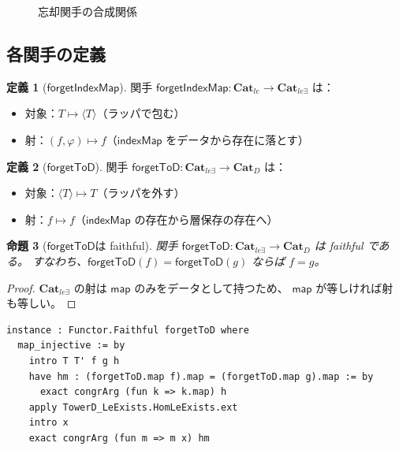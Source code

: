 \documentclass[a4paper,11pt]{ltjsarticle}
\theoremstyle{definition}
\newtheorem{definition}{定義}[section]
\theoremstyle{plain}
\newtheorem{proposition}[definition]{命題}
\newcommand{\CatD}{\mathbf{Cat}_D}
\newcommand{\Catle}{\mathbf{Cat}_{le}}
\newcommand{\CatleE}{\mathbf{Cat}_{le\exists}}
\newcommand{\indexMap}{\mathsf{indexMap}}
\begin{document}
\begin{figure}[htbp]
\centering
{}
\caption{忘却関手の合成関係}
\label{fig:forgetful-functors}
\end{figure}

\subsection{各関手の定義}

\begin{definition}[$\mathsf{forgetIndexMap}$]
\label{def:forget-index-map}
関手 $\mathsf{forgetIndexMap} : \Catle \to \CatleE$ は：
\begin{itemize}
  \item 対象：$T \mapsto \langle T \rangle$（ラッパで包む）
  \item 射：$(f, \varphi) \mapsto f$（$\indexMap$ をデータから存在に落とす）
\end{itemize}
\end{definition}

\begin{definition}[$\mathsf{forgetToD}$]
\label{def:forget-to-d}
関手 $\mathsf{forgetToD} : \CatleE \to \CatD$ は：
\begin{itemize}
  \item 対象：$\langle T \rangle \mapsto T$（ラッパを外す）
  \item 射：$f \mapsto f$（$\indexMap$ の存在から層保存の存在へ）
\end{itemize}
\end{definition}

\begin{proposition}[$\mathsf{forgetToD}$は faithful]
\label{prop:forget-to-d-faithful}
関手 $\mathsf{forgetToD} : \CatleE \to \CatD$ は faithful である。
すなわち、$\mathsf{forgetToD}(f) = \mathsf{forgetToD}(g)$ ならば $f = g$。
\end{proposition}

\begin{proof}
$\CatleE$ の射は $\mathsf{map}$ のみをデータとして持つため、
$\mathsf{map}$ が等しければ射も等しい。
\end{proof}

\begin{leancode}
\begin{lstlisting}
instance : Functor.Faithful forgetToD where
  map_injective := by
    intro T T' f g h
    have hm : (forgetToD.map f).map = (forgetToD.map g).map := by
      exact congrArg (fun k => k.map) h
    apply TowerD_LeExists.HomLeExists.ext
    intro x
    exact congrArg (fun m => m x) hm
\end{lstlisting}
\end{leancode}
\end{document}
